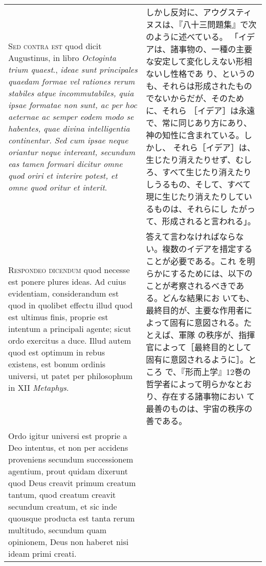 \documentclass[10pt]{jsarticle} %
\begin{document}
\begin{longtable}{p{21em}p{21em}}
\\


{\scshape Sed contra est} quod dicit Augustinus, in libro {\itshape
Octoginta trium quaest}., {\itshape ideae sunt principales quaedam
formae vel rationes rerum stabiles atque incommutabiles, quia ipsae
formatae non sunt, ac per hoc aeternae ac semper eodem modo se habentes,
quae divina intelligentia continentur. Sed cum ipsae neque oriantur
neque intereant, secundum eas tamen formari dicitur omne quod oriri et
interire potest, et omne quod oritur et interit}.

&


しかし反対に、アウグスティヌスは、『八十三問題集』で次のように述べている。
「イデアは、諸事物の、一種の主要な安定して変化しえない形相ないし性格であ
り、というのも、それらは形成されたものでないからだが、そのために、それら
［イデア］は永遠で、常に同じあり方にあり、神の知性に含まれている。しかし、
それら［イデア］は、生じたり消えたりせず、むしろ、すべて生じたり消えたり
しうるもの、そして、すべて現に生じたり消えたりしているものは、それらにし
たがって、形成されると言われる」。


\\


{\scshape Respondeo dicendum} quod necesse est ponere plures ideas. Ad
cuius evidentiam, considerandum est quod in quolibet effectu illud quod
est ultimus finis, proprie est intentum a principali agente; sicut ordo
exercitus a duce. Illud autem quod est optimum in rebus existens, est
bonum ordinis universi, ut patet per philosophum in XII {\itshape
Metaphys}. 

&

答えて言わなければならない。複数のイデアを措定することが必要である。これ
を明らかにするためには、以下のことが考察されるべきである。どんな結果にお
いても、最終目的が、主要な作用者によって固有に意図される。たとえば、軍隊
の秩序が、指揮官によって［最終目的として固有に意図されるように］。ところ
で、『形而上学』12巻の哲学者によって明らかなとおり、存在する諸事物におい
て最善のものは、宇宙の秩序の善である。


\\


Ordo igitur universi est proprie a Deo intentus, et non per
accidens proveniens secundum successionem agentium, prout quidam
dixerunt quod Deus creavit primum creatum tantum, quod creatum creavit
secundum creatum, et sic inde quousque producta est tanta rerum
multitudo, secundum quam opinionem, Deus non haberet nisi ideam primi
creati. 


&


\end{longtable}
\end{document}
